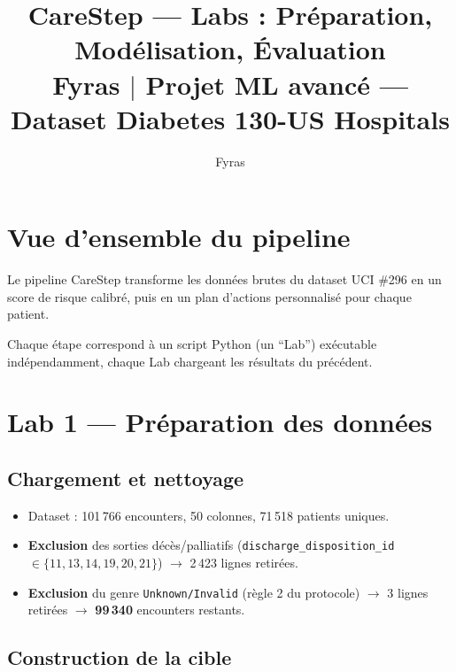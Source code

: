 \documentclass[11pt,a4paper]{article}
\title{\textbf{CareStep} --- Labs : Pr\'eparation, Mod\'elisation, \'Evaluation\\
\large Fyras $\mid$ Projet ML avanc\'e --- Dataset Diabetes 130-US Hospitals}
\author{Fyras}
\date{}
\begin{document}
\maketitle

\section{Vue d'ensemble du pipeline}

Le pipeline CareStep transforme les donn\'ees brutes du dataset UCI \#296 en un score de risque calibr\'e, puis en un plan d'actions personnalis\'e pour chaque patient.

\medskip
\noindent
{}

\medskip
Chaque \'etape correspond \`a un script Python (un ``Lab'') ex\'ecutable ind\'ependamment, chaque Lab chargeant les r\'esultats du pr\'ec\'edent.

\section{Lab 1 --- Pr\'eparation des donn\'ees}

\subsection{Chargement et nettoyage}

\begin{itemize}
  \item Dataset : 101\,766 encounters, 50 colonnes, 71\,518 patients uniques.
  \item \textbf{Exclusion} des sorties d\'ec\`es/palliatifs (\texttt{discharge\_disposition\_id} $\in \{11,13,14,19,20,21\}$) $\to$ 2\,423 lignes retir\'ees.
  \item \textbf{Exclusion} du genre \texttt{Unknown/Invalid} (r\`egle 2 du protocole) $\to$ 3 lignes retir\'ees $\to$ \textbf{99\,340} encounters restants.
\end{itemize}

\subsection{Construction de la cible}
\end{document}
